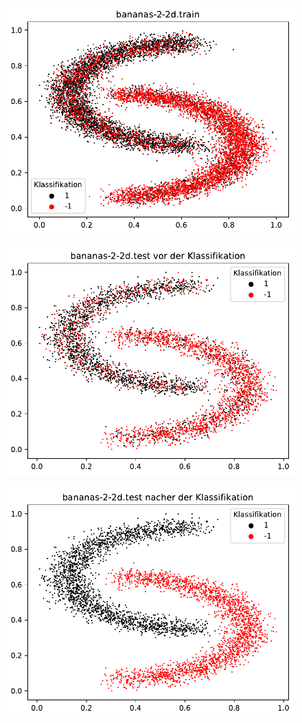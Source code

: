 \documentclass{beamer}
\begin{document}
\begin{figure}[h]
\centering
\includegraphics[scale=0.7]{bananas-2-2d-train.pdf}
\label{bananas}
\end{figure}

\begin{figure}[h]
\centering
\includegraphics[scale=0.7]{bananas-2-2d-test-vorher.pdf}
\label{bananas}
\end{figure}

\begin{figure}[h]
\centering
\includegraphics[scale=0.7]{bananas-2-2d-test-nachher.pdf}
\label{bananas}
\end{figure}
\end{document}
